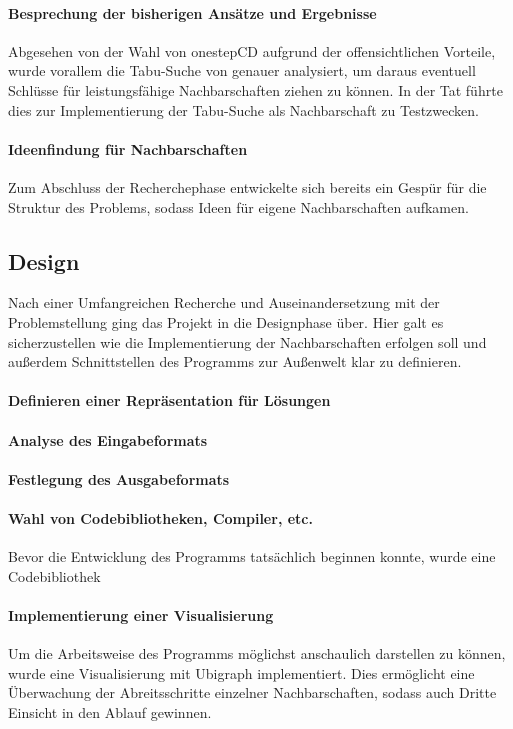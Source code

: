 \paragraph{Besprechung der bisherigen Ansätze und Ergebnisse}{Abgesehen von der Wahl von onestepCD aufgrund der offensichtlichen Vorteile, wurde vorallem die Tabu-Suche von genauer analysiert, um daraus eventuell Schlüsse für leistungsfähige Nachbarschaften ziehen zu können. In der Tat führte dies zur Implementierung der Tabu-Suche als Nachbarschaft zu Testzwecken.} %

\paragraph{Ideenfindung für Nachbarschaften}{Zum Abschluss der Recherchephase entwickelte sich bereits ein Gespür für die Struktur des Problems, sodass Ideen für eigene Nachbarschaften aufkamen.} %

\subsection{Design}

Nach einer Umfangreichen Recherche und Auseinandersetzung mit der Problemstellung ging das Projekt in die Designphase über. Hier galt es sicherzustellen wie die Implementierung der Nachbarschaften erfolgen soll und außerdem Schnittstellen des Programms zur Außenwelt klar zu definieren.

\paragraph{Definieren einer Repräsentation für Lösungen}{}
\paragraph{Analyse des Eingabeformats}{}
\paragraph{Festlegung des Ausgabeformats}{}
\paragraph{Wahl von Codebibliotheken, Compiler, etc.}{Bevor die Entwicklung des Programms tatsächlich beginnen konnte, wurde eine Codebibliothek}
\paragraph{Implementierung einer Visualisierung}{Um die Arbeitsweise des Programms möglichst anschaulich darstellen zu können, wurde eine Visualisierung mit Ubigraph implementiert. Dies ermöglicht eine Überwachung der Abreitsschritte einzelner Nachbarschaften, sodass auch Dritte Einsicht in den Ablauf gewinnen.}

